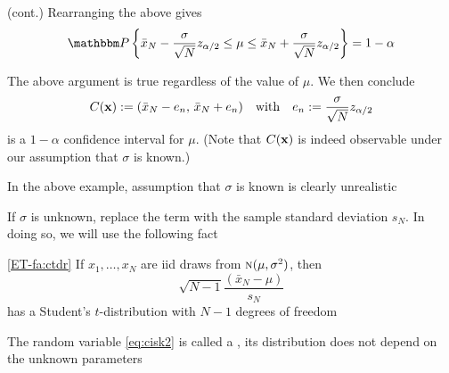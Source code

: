 \begin{frame}

    \vspace{2em}
    \Eg (cont.)
    Rearranging the above gives
    \begin{equation*}
        \PP
            \left\{ 
            \bar x_N - 
                \frac{\sigma}{\sqrt{N}} z_{\alpha/2}
            \leq \mu \leq 
            \bar x_N + 
                \frac{\sigma}{\sqrt{N}} z_{\alpha/2}
            \right\}
        = 1 - \alpha
    \end{equation*}

    The above argument is true regardless of the value of $\mu$. We then conclude
    \begin{equation*}
        C({\mathbf x}) 
        := (\bar x_N - e_n, \, \bar x_N + e_n)
        \quad \text{with} \quad
        e_n := \frac{\sigma}{\sqrt{N}} z_{\alpha/2}
    \end{equation*}
    is a $1 - \alpha$ confidence interval for $\mu$. (Note that
    $C({\mathbf x})$ is indeed observable under our assumption that $\sigma$ is known.)
    
\end{frame}

\begin{frame}

    \vspace{2em}
    In the above example, assumption that $\sigma$ is known is clearly
    unrealistic
    
    If $\sigma$ is unknown,  replace the
    term with the sample standard deviation $s_N$. In doing so, we will use the following fact
    
    \vspace{.7em}
    \Fact\eqref{ET-fa:ctdr}
        If $x_1,\ldots,x_N$ are {\sc iid} draws from $\textrm{\sc n}(\mu, \sigma^2)$, then
        \begin{equation}
            \label{eq:cisk2}
            \sqrt{N - 1} \frac{(\bar x_N - \mu)}{s_N} 
        \end{equation}
        has a Student's $t$-distribution with $N-1$ degrees of freedom
    
    \vspace{.7em}    
    The random variable \eqref{eq:cisk2} is called a , its distribution
    does not depend on the unknown parameters
    
\end{frame}

